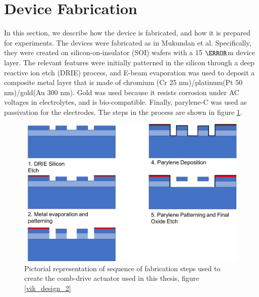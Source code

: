 \section{Device Fabrication}
In this section, we describe how the device is fabricated, and how it is prepared for experiments. The devices were fabricated as in Mukundan et al. Specifically, they were created on silicon-on-insulator (SOI) wafers with a 15 $\micro$m device layer. The relevant features were initially patterned in the silicon through a deep reactive ion etch (DRIE) process, and E-beam evaporation was used to deposit a composite metal layer that is made of chromium (Cr 25 nm)/platinum(Pt 50 nm)/gold(Au 300 nm). Gold was used because it resists corrosion under AC voltages in electrolytes, and is bio-compatible. Finally, parylene-C was used as passivation for the electrodes. The steps in the process are shown in figure \ref{fab_steps}. 

\begin{figure}[htpb]
    \includegraphics[width=\linewidth]{Chapter2/Figs/Raster/fabricationStepsDesgn2.png}
    \caption{Pictorial representation of sequence of fabrication steps used to create the comb-drive actuator used in this thesis, figure \ref{vik_design_2}}\label{fab_steps}
\end{figure}

